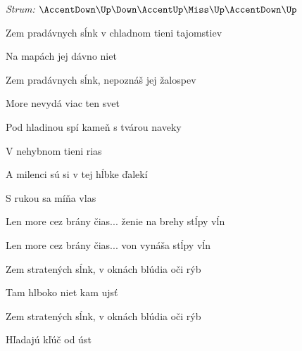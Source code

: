 \begin{song}


\begin{headerbox}
\RaiseBoxWithAccents
\textit{Strum:} $\AccentDown\Up\Down\AccentUp\Miss\Up\AccentDown\Up$
\end{headerbox}

\begin{vchordbox}
\end{vchordbox}

\large

\bigskip


Zem pradávnych sĺnk v chladnom tieni tajomstiev \par
Na mapách jej dávno niet \par
Zem pradávnych sĺnk, nepoznáš jej žalospev \par
More nevydá viac ten svet \par

\bigskip

Pod hladinou spí kameň s tvárou naveky \par
{}V nehybnom tieni rias \par
A milenci sú si v tej hĺbke ďalekí \par
{}S rukou sa míňa vlas \par

\bigskip

Len more cez brány čias... ženie na brehy stĺpy vĺn \par
Len more cez brány čias... von vynáša stĺpy vĺn \par

\bigskip

 \par

\bigskip

Zem stratených sĺnk, v oknách blúdia oči rýb \par
Tam hlboko niet kam ujsť \par
Zem stratených sĺnk, v oknách blúdia oči rýb \par
{}Hľadajú kľúč od úst \par


\end{song}
